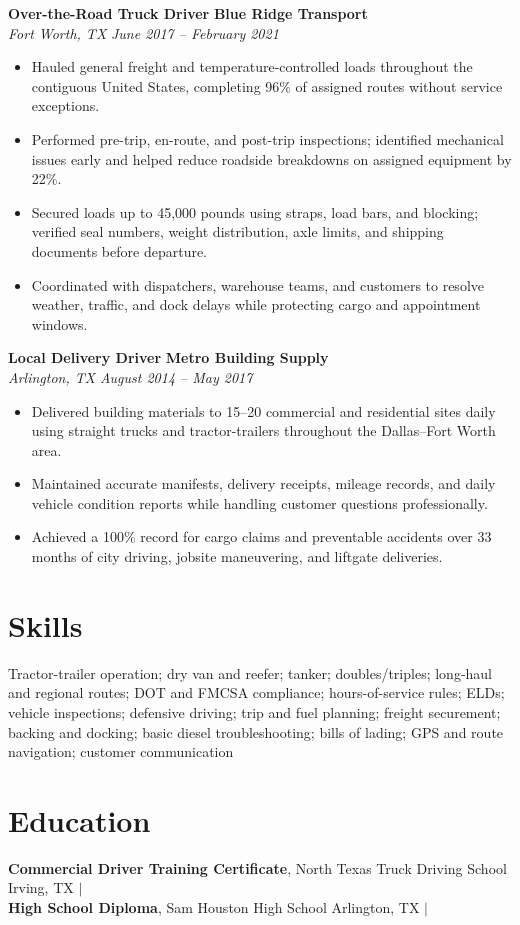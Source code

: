 \documentclass[10pt,letterpaper]{article}
\newcommand{\job}[4]{%
  \textbf{#1} \hfill \textbf{#2}\\[-0.1em]
  \textit{#3} \hfill \textit{#4}\vspace{-0.15em}
}
\begin{document}
\job{Over-the-Road Truck Driver}{Blue Ridge Transport}{Fort Worth, TX}{June 2017 -- February 2021}
\begin{itemize}
  \item Hauled general freight and temperature-controlled loads throughout the contiguous United States, completing 96\% of assigned routes without service exceptions.
  \item Performed pre-trip, en-route, and post-trip inspections; identified mechanical issues early and helped reduce roadside breakdowns on assigned equipment by 22\%.
  \item Secured loads up to 45,000 pounds using straps, load bars, and blocking; verified seal numbers, weight distribution, axle limits, and shipping documents before departure.
  \item Coordinated with dispatchers, warehouse teams, and customers to resolve weather, traffic, and dock delays while protecting cargo and appointment windows.
\end{itemize}

\job{Local Delivery Driver}{Metro Building Supply}{Arlington, TX}{August 2014 -- May 2017}
\begin{itemize}
  \item Delivered building materials to 15--20 commercial and residential sites daily using straight trucks and tractor-trailers throughout the Dallas--Fort Worth area.
  \item Maintained accurate manifests, delivery receipts, mileage records, and daily vehicle condition reports while handling customer questions professionally.
  \item Achieved a 100\% record for cargo claims and preventable accidents over 33 months of city driving, jobsite maneuvering, and liftgate deliveries.
\end{itemize}

\section*{Skills}
Tractor-trailer operation; dry van and reefer; tanker; doubles/triples; long-haul and regional routes; DOT and FMCSA compliance; hours-of-service rules; ELDs; vehicle inspections; defensive driving; trip and fuel planning; freight securement; backing and docking; basic diesel troubleshooting; bills of lading; GPS and route navigation; customer communication

\section*{Education}
\textbf{Commercial Driver Training Certificate}, North Texas Truck Driving School \hfill Irving, TX \enspace $\vert$ \\
\textbf{High School Diploma}, Sam Houston High School \hfill Arlington, TX \enspace $\vert$ 
\end{document}
